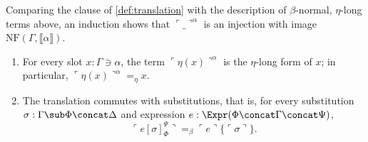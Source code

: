 Comparing the clause of \cref{def:translation} with the description of $\beta$-normal, $\eta$-long terms above, an induction shows that $\ulcorner \_ \urcorner^\alpha$ is an injection with image $\mathrm{NF}(\Gamma, \llbracket \alpha \rrbracket)$.

\begin{lemma}\label{lem:translation}
    \begin{enumerate}
        \item For every slot $x : \Gamma \ni \alpha$, the term $\ulcorner \eta(x) \urcorner^\alpha$ is the $\eta$-long form of $x$; in particular, $\ulcorner \eta(x) \urcorner^\alpha =_\eta x$.
        \item The translation commutes with substitutions, that is, for every substitution $\sigma : \Gamma \sub \Phi \concat \Delta$ and expression $e : \Expr(\Phi \concat \Gamma \concat \Psi)$,
        \[
        \ulcorner e[\sigma]_\Phi^\Psi \urcorner =_\beta \ulcorner e \urcorner\{\ulcorner \sigma \urcorner\}.
        \]
    \end{enumerate}
\end{lemma}

